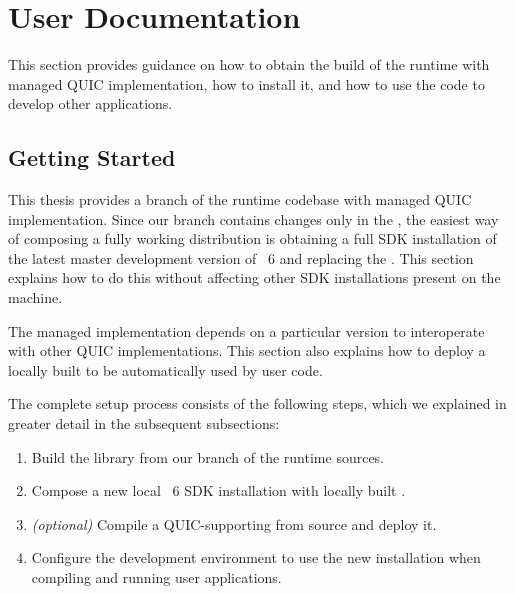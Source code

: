 \chapter{User Documentation}\label{chap:06-user-docs}

This section provides guidance on how to obtain the build of the \dotnet{} runtime with managed QUIC
implementation, how to install it, and how to use the code to develop other applications.

\section{Getting Started}

This thesis provides a branch of the \dotnet{} runtime codebase with managed QUIC implementation.
Since our branch contains changes only in the \SystemNetQuicDll{}, the easiest way of composing a
fully working \dotnet{} distribution is obtaining a full SDK installation of the latest master
development version of \dotnet{}~6 and replacing the \SystemNetQuicDll{}. This section explains how
to do this without affecting other \dotnet{} SDK installations present on the machine.

The managed implementation depends on a particular \libopenssl{} version to interoperate with other
QUIC implementations. This section also explains how to deploy a locally built \libopenssl{} to be
automatically used by user code.

The complete setup process consists of the following steps, which we explained in greater detail in
the subsequent subsections:

\begin{enumerate}

  \item Build the \SystemNetQuicDll{} library from our branch of the \dotnet{} runtime sources.

  \item Compose a new local \dotnet{}~6 SDK installation with locally built \SystemNetQuicDll{}.

  \item \textit{(optional)} Compile a QUIC-supporting \libopenssl{} from source and deploy it.

  \item Configure the development environment to use the new \dotnet{} installation when compiling
and running user applications.

\end{enumerate}

